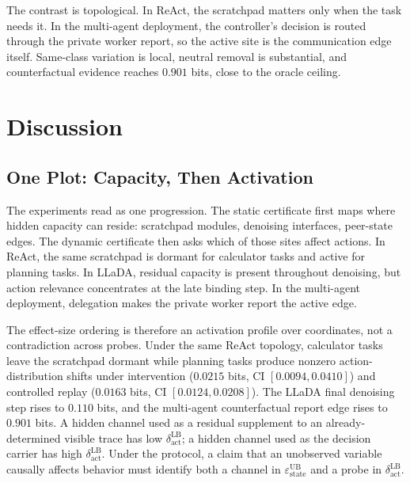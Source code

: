 \documentclass{article}
\begin{document}
The contrast is topological. In ReAct, the scratchpad matters only when the task needs it. In the multi-agent deployment, the controller's decision is routed through the private worker report, so the active site is the communication edge itself. Same-class variation is local, neutral removal is substantial, and counterfactual evidence reaches $0.901$ bits, close to the oracle ceiling.

\section{Discussion}
\label{sec:discussion}

\subsection{One Plot: Capacity, Then Activation}

The experiments read as one progression. The static certificate first maps where hidden capacity can reside: scratchpad modules, denoising interfaces, peer-state edges. The dynamic certificate then asks which of those sites affect actions. In ReAct, the same scratchpad is dormant for calculator tasks and active for planning tasks. In LLaDA, residual capacity is present throughout denoising, but action relevance concentrates at the late binding step. In the multi-agent deployment, delegation makes the private worker report the active edge.

The effect-size ordering is therefore an activation profile over coordinates, not a contradiction across probes. Under the same ReAct topology, calculator tasks leave the scratchpad dormant while planning tasks produce nonzero action-distribution shifts under intervention ($0.0215$ bits, CI $[0.0094,0.0410]$) and controlled replay ($0.0163$ bits, CI $[0.0124,0.0208]$). The LLaDA final denoising step rises to $0.110$ bits, and the multi-agent counterfactual report edge rises to $0.901$ bits. A hidden channel used as a residual supplement to an already-determined visible trace has low $\delta_\text{act}^\text{LB}$; a hidden channel used as the decision carrier has high $\delta_\text{act}^\text{LB}$. Under the protocol, a claim that an unobserved variable causally affects behavior must identify both a channel in $\varepsilon_\text{state}^\text{UB}$ and a probe in $\delta_\text{act}^\text{LB}$.
\end{document}
